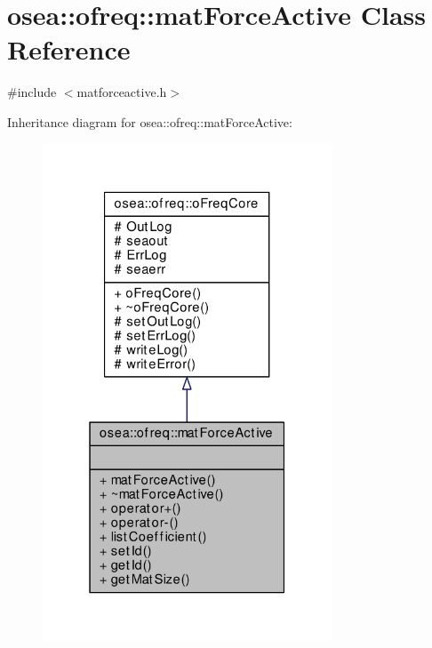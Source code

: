 \hypertarget{classosea_1_1ofreq_1_1mat_force_active}{\section{osea\-:\-:ofreq\-:\-:mat\-Force\-Active Class Reference}
\label{classosea_1_1ofreq_1_1mat_force_active}
}


{\ttfamily \#include $<$matforceactive.\-h$>$}



Inheritance diagram for osea\-:\-:ofreq\-:\-:mat\-Force\-Active\-:
\nopagebreak
\begin{figure}[H]
\begin{center}
\leavevmode
\includegraphics[width=244pt]{classosea_1_1ofreq_1_1mat_force_active__inherit__graph}
\end{center}
\end{figure}
